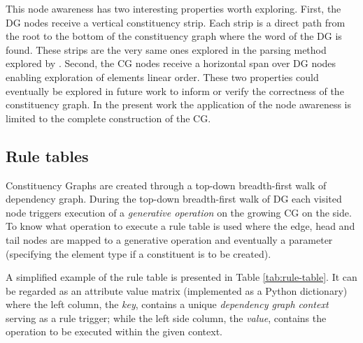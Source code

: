 This node awareness has two interesting properties worth exploring. First, the DG nodes receive a vertical constituency strip. Each strip is a direct path from the root to the bottom of the constituency graph where the word of the DG is found. These strips are the very same ones explored in the parsing method explored by \citet{Day2007}.    
Second, the CG nodes receive a horizontal span over DG nodes enabling exploration of elements linear order. These two properties could eventually be explored in future work to inform or verify the correctness of the constituency graph. In the present work the application of the node awareness is limited to the complete construction of the CG.

\subsection{Rule tables}
\label{sec:rule-table}

Constituency Graphs are created through a top-down breadth-first walk of dependency graph. During the top-down breadth-first walk of DG each visited node triggers execution of a \textit{generative operation} on the growing CG on the side. To know what operation to execute a rule table is used where the edge, head and tail nodes are mapped to a generative operation and eventually a parameter (specifying the element type if a constituent is to be created).

A simplified example of the rule table is presented in Table \ref{tab:rule-table}. It can be regarded as an attribute value matrix (implemented as a Python dictionary) where the left column, the \textit{key}, contains a unique \textit{dependency graph context} serving as a rule trigger; while the left side column, the \textit{value}, contains the operation to be executed within the given context. 

